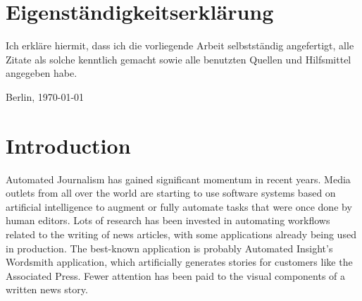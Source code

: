 \documentclass[11pt,a4paper,twoside]{article}
\begin{document}
\clearpage

\section*{Eigenständigkeitserklärung}


\noindent Ich erkläre hiermit, dass ich die vorliegende Arbeit
selbstständig angefertigt, alle Zitate als solche kenntlich gemacht
sowie alle benutzten Quellen und Hilfsmittel angegeben habe.

\bigskip\noindent Berlin, \today

\vspace{4ex}\noindent\makebox[7cm]{\dotfill}


\cleardoublepage
\pagestyle{fancy}
\setcounter{page}{1}

\tableofcontents


\cleardoublepage

\setcounter{page}{1}
\fancyhead[LE,RO]{\rightmark}
\fancyfoot[LE,RO]{\thepage}

\section{Introduction}

Automated Journalism has gained significant momentum in recent years. Media outlets from all over the world are starting to use software systems based on artificial intelligence to augment or fully automate tasks that were once done by human editors. Lots of research has been invested in automating workflows related to the writing of news articles, with some applications already being used in production. The best-known application is probably Automated Insight's Wordsmith application, which artificially generates stories for customers like the Associated Press. \cite{AssociatedPressAutomatedInsights} Fewer attention has been paid to the visual components of a written news story. 
\end{document}
